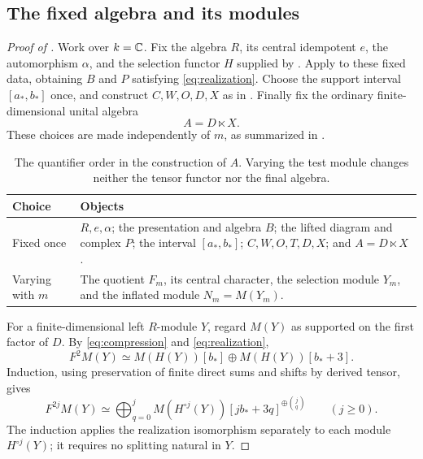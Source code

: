 \subsection{The fixed algebra and its modules}

\begin{proof}[Proof of ]
Work over \(k=\mathbb C\).
Fix the algebra \(R\), its central idempotent \(e\),
the automorphism \(\alpha\), and the selection functor
\(H\) supplied by .
Apply  to these fixed data,
obtaining \(B\) and \(P\) satisfying
\eqref{eq:realization}.
Choose the support interval \([a_*,b_*]\) once, and
construct \(C,W,O,D,X\) as in
.
Finally fix the ordinary finite-dimensional unital
algebra
\[
A=D\ltimes X.
\]
These choices are made independently of \(m\), as summarized in
.

\begin{table}[htbp]
\centering
\begin{tabular}{@{}p{}p{}@{}}
\toprule
Choice & Objects \\
\midrule
Fixed once & \(R,e,\alpha\); the presentation and algebra \(B\);
the lifted diagram and complex \(P\); the interval \([a_*,b_*]\);
\(C,W,O,T,D,X\); and \(A=D\ltimes X\). \\
Varying with \(m\) & The quotient \(F_m\), its central character,
the selection module \(Y_m\), and the inflated module
\(N_m=M(Y_m)\). \\
\bottomrule
\end{tabular}
\caption{The quantifier order in the construction of \(A\). Varying the
test module changes neither the tensor functor nor the final algebra.}
\label{tab:fixed-varying}
\end{table}

For a finite-dimensional left \(R\)-module \(Y\),
regard \(M(Y)\) as supported on the first factor
of \(D\).  By \eqref{eq:compression} and
\eqref{eq:realization},
\[
F^2M(Y)
\simeq M(H(Y))[b_*]\oplus M(H(Y))[b_*+3].
\]
Induction, using preservation of finite direct sums
and shifts by derived tensor, gives
\begin{equation}
\label{eq:even-iterates}
F^{2j}M(Y)
\simeq
\bigoplus_{q=0}^{j}
M(H^{\circ j}(Y))[jb_*+3q]^{\oplus\binom{j}{q}}
\qquad(j\ge0).
\end{equation}
The induction applies the realization isomorphism
separately to each module \(H^{\circ j}(Y)\); it requires
no splitting natural in \(Y\).


\end{proof}
